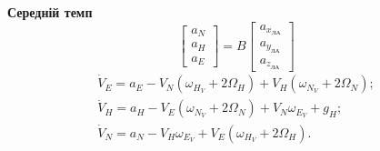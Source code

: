 \textbf{Середній темп}
\begin{equation} 
\label{eq:maccel} 
\left[\begin{array}{c} 
{a_{N}} \\ 
{a_{H}} \\ 
{a_{E}} \end{array}\right]=
B\left[\begin{array}{c} 
{a_{x_{\text{ЛА}}}} \\ 
{a_{y_{\text{ЛА}}}} \\ 
{a_{z_{\text{ЛА}}}} 
\end{array}\right]                                                    
\end{equation} 
\begin{equation} 
\label{eq:mdv} 
\begin{array}{l} 
{\dot{V}_{E} =a_{E} -V_{N}(\omega_{H_{V}} +2\Omega_{H} )+V_{H} (\omega_{N_{V}} +2\Omega_{N} );} \\ 
{\dot{V}_{H} =a_{H} -V_{E}(\omega_{N_{V}} +2\Omega_{N} )+V_{N} \omega_{E_{V}} +g_{H} ;} \\ 
{\dot{V}_{N} =a_{N} -V_{H} \omega_{E_{V}} +V_{E} (\omega_{H_{V}} +2\Omega_{H} ).} 
\end{array} 
\end{equation} 

